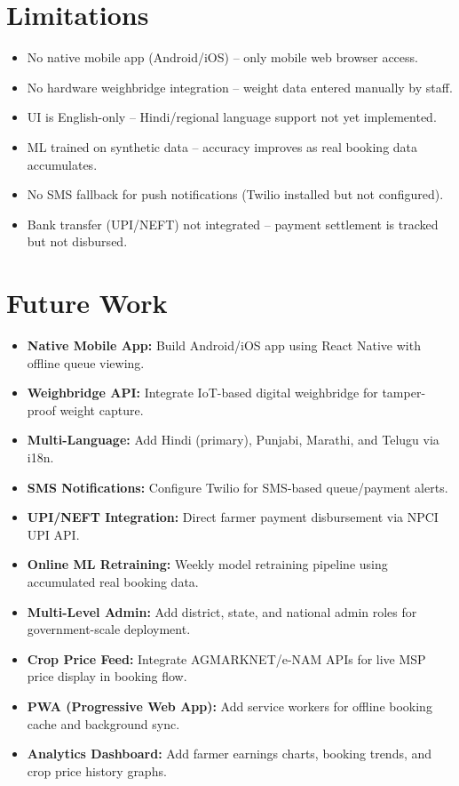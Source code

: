 \section{Limitations}
\begin{itemize}
  \item No native mobile app (Android/iOS) -- only mobile web browser access.
  \item No hardware weighbridge integration -- weight data entered manually by staff.
  \item UI is English-only -- Hindi/regional language support not yet implemented.
  \item ML trained on synthetic data -- accuracy improves as real booking data accumulates.
  \item No SMS fallback for push notifications (Twilio installed but not configured).
  \item Bank transfer (UPI/NEFT) not integrated -- payment settlement is tracked but not disbursed.
\end{itemize}

\section{Future Work}
\begin{itemize}
  \item \textbf{Native Mobile App:} Build Android/iOS app using React Native with offline queue viewing.
  \item \textbf{Weighbridge API:} Integrate IoT-based digital weighbridge for tamper-proof weight capture.
  \item \textbf{Multi-Language:} Add Hindi (primary), Punjabi, Marathi, and Telugu via i18n.
  \item \textbf{SMS Notifications:} Configure Twilio for SMS-based queue/payment alerts.
  \item \textbf{UPI/NEFT Integration:} Direct farmer payment disbursement via NPCI UPI API.
  \item \textbf{Online ML Retraining:} Weekly model retraining pipeline using accumulated real booking data.
  \item \textbf{Multi-Level Admin:} Add district, state, and national admin roles for government-scale deployment.
  \item \textbf{Crop Price Feed:} Integrate AGMARKNET/e-NAM APIs for live MSP price display in booking flow.
  \item \textbf{PWA (Progressive Web App):} Add service workers for offline booking cache and background sync.
  \item \textbf{Analytics Dashboard:} Add farmer earnings charts, booking trends, and crop price history graphs.
\end{itemize}
